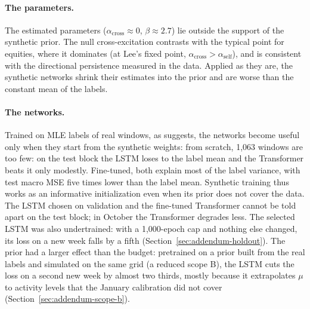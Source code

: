 \paragraph{The parameters.} The estimated parameters (\(\alpha_{\mathrm{cross}}\approx0\),
\(\beta\approx2.7\)) lie outside the support of the synthetic prior. The null
cross-excitation contrasts with the typical point for equities, where it dominates (at Lee's
fixed point, \(\alpha_{\mathrm{cross}}>\alpha_{\mathrm{self}}\)), and is consistent with the
directional persistence measured in the data. Applied as they are, the synthetic networks
shrink their estimates into the prior and are worse than the constant mean of the labels.

\paragraph{The networks.} Trained on MLE labels of real windows, as \citet{lee2023} suggests,
the networks become useful only when they start from the synthetic weights: from scratch,
1,063 windows are too few: on the test block the LSTM loses to the label mean and the
Transformer beats it only modestly. Fine-tuned, both explain most of the label variance,
with test macro MSE five times lower than the label mean. Synthetic training thus works as
an informative initialization even when its prior does not cover the data. The LSTM chosen on
validation and the fine-tuned Transformer cannot be told apart on the test block; in October
the Transformer degrades less. The selected LSTM was also undertrained: with a 1,000-epoch cap and
nothing else changed, its loss on a new week falls by a fifth (Section~\ref{sec:addendum-holdout}).
The prior had a larger effect than the budget: pretrained on a prior built from the real labels and
simulated on the same grid (a reduced scope B), the LSTM cuts the loss on a second new week by
almost two thirds, mostly because it extrapolates $\mu$ to activity levels that the January
calibration did not cover (Section~\ref{sec:addendum-scope-b}).

